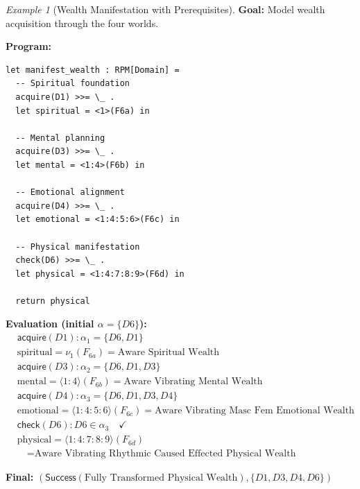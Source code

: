 \documentclass[11pt,twoside,openright]{book}
\theoremstyle{definition}
\theoremstyle{plain}
\theoremstyle{remark}
\newtheorem{example}[definition]{Example}
\newcommand{\noe}[1]{\nu_{#1}}
\begin{document}
\begin{example}[Wealth Manifestation with Prerequisites]
\label{ex:wealth-manifest}
\textbf{Goal:} Model wealth acquisition through the four worlds.

\textbf{Program:}
\begin{verbatim}
let manifest_wealth : RPM[Domain] =
  -- Spiritual foundation
  acquire(D1) >>= \_ .
  let spiritual = <1>(F6a) in

  -- Mental planning
  acquire(D3) >>= \_ .
  let mental = <1:4>(F6b) in

  -- Emotional alignment
  acquire(D4) >>= \_ .
  let emotional = <1:4:5:6>(F6c) in

  -- Physical manifestation
  check(D6) >>= \_ .
  let physical = <1:4:7:8:9>(F6d) in

  return physical
\end{verbatim}

\textbf{Evaluation (initial $\alpha = \{D6\}$):}
\begin{align}
&\mathsf{acquire}(D1): \alpha_1 = \{D6, D1\} \\
&\text{spiritual} = \noe{1}(F_{6a}) = \text{Aware Spiritual Wealth} \\[0.5em]
&\mathsf{acquire}(D3): \alpha_2 = \{D6, D1, D3\} \\
&\text{mental} = \langle 1:4 \rangle(F_{6b}) = \text{Aware Vibrating Mental Wealth} \\[0.5em]
&\mathsf{acquire}(D4): \alpha_3 = \{D6, D1, D3, D4\} \\
&\text{emotional} = \langle 1:4:5:6 \rangle(F_{6c}) = \text{Aware Vibrating Masc Fem Emotional Wealth} \\[0.5em]
&\mathsf{check}(D6): D6 \in \alpha_3 \quad \checkmark \\
&\text{physical} = \langle 1:4:7:8:9 \rangle(F_{6d}) \\
&\quad = \text{Aware Vibrating Rhythmic Caused Effected Physical Wealth}
\end{align}

\textbf{Final:} $(\mathsf{Success}(\text{Fully Transformed Physical Wealth}), \{D1, D3, D4, D6\})$
\end{example}
\end{document}
